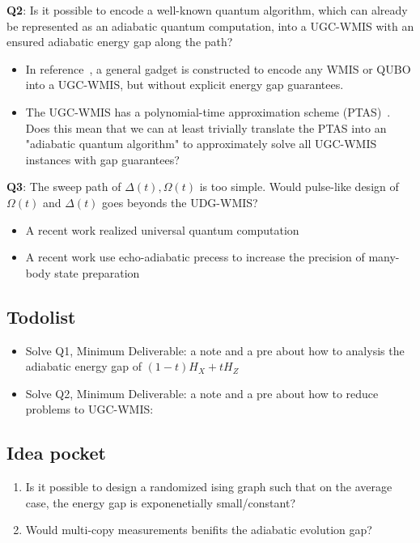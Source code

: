 \textbf{Q2}: Is it possible to encode a well-known quantum algorithm, which can already be represented as an adiabatic quantum computation, into a UGC-WMIS with an ensured adiabatic energy gap along the path?
\begin{itemize}
    \item In reference~\cite{nguyen2023quantum}, a general gadget is constructed to encode any WMIS or QUBO into a UGC-WMIS, but without explicit energy gap guarantees.
    \item The UGC-WMIS has a polynomial-time approximation scheme (PTAS)~\cite{das2020efficient}. Does this mean that we can at least trivially translate the PTAS into an "adiabatic quantum algorithm" to approximately solve all UGC-WMIS instances with gap guarantees?
\end{itemize}

\vspace{1em}

\textbf{Q3}: The sweep path of $\Delta(t),\Omega(t)$ is too simple. Would pulse-like design of $\Omega(t)$ and $\Delta(t)$ goes beyonds the UDG-WMIS?
\begin{itemize}
    \item A recent work realized universal quantum computation~\cite{werner2026polynomial}
    \item A recent work use echo-adiabatic precess to increase the precision of many-body state preparation~\cite{zeng2026adiabatic}
\end{itemize}

\subsection*{Todolist}

\begin{itemize}
    \item Solve Q1,  Minimum Deliverable: a note and a pre about how to analysis the adiabatic energy gap of $(1-t)H_X + t H_Z$
    \item Solve Q2, Minimum Deliverable:  a note and a pre about how to reduce problems to UGC-WMIS:
\end{itemize}

\subsection*{Idea pocket}

\begin{enumerate}
    \item Is it possible to design a randomized ising graph such that on the average case, the energy gap is exponenetially small/constant?
    \item Would multi-copy measurements benifits the adiabatic evolution gap?
\end{enumerate}
